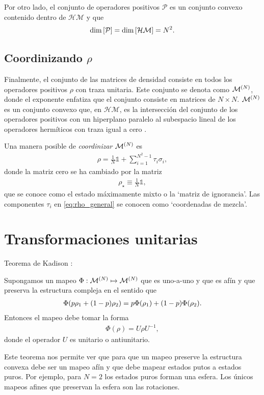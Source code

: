 Por otro lado, el conjunto de operadores positivos $\mathcal{P}$ es un 
conjunto convexo contenido dentro de $\mathcal{HM}$ y que
\begin{align}
	\dim \qty[\mathcal{P}] = \dim \qty[\mathcal{HM}]=N^2.
\end{align}
\subsection{Coordinizando  $\rho$} %

Finalmente, el conjunto de las matrices de densidad consiste en todos los operadores
positivos $\rho$ con traza unitaria. Este conjunto se denota como 
$\mathcal{M}^{(N)}$, donde el exponente enfatiza que el conjunto consiste en 
matrices de $N\times N$. $\mathcal{M}^{(N)}$ es un conjunto convexo que, en $\mathcal{HM}$, 
es la intersección del conjunto de los operadores positivos con un 
hiperplano paralelo al subespacio lineal de los operadores hermíticos
con traza igual a cero \cite{bengtsson_zyczkowski_2017}.

Una manera posible de \textit{coordinizar} $\mathcal{M}^{(N)}$ es 
\begin{align}
	\rho = \frac{1}{N} \mathbb{1} + \sum _{i=1}^{N^2-1} \tau_i\sigma_i,	
	\label{eq:rho_general}
\end{align}
donde la matriz cero se ha cambiado por la matriz
\begin{align}
	\rho _{\star} \equiv \frac{1}{N}\mathbb{1},
	\label{eq:max_mixed_state}
\end{align}
que se conoce como el estado máximamente mixto o la `matriz de ignorancia'. 
Las componentes $\tau_i$ en \eqref{eq:rho_general} se conocen como `coordenadas
de mezcla'.
\section{Transformaciones unitarias} %

Teorema de Kadison \cite{bengtsson_zyczkowski_2017}:
\begin{teorema} 
	Supongamos un mapeo $\Phi:\mathcal{M}^{(N)} \mapsto \mathcal{M}^{(N)}$ que es uno-a-uno y que es afín y
	que preserva la estructura compleja en el sentido que
	\begin{align}
		\Phi \qty(p\rho_1 + \qty(1-p)\rho_2) = p\Phi(\rho_1) + 
		\qty(1-p)\Phi(\rho_2).
	\end{align}
	Entonces el mapeo debe tomar la forma
	\begin{align}
		\Phi(\rho) = U\rho U^{-1},
	\end{align}
	donde el operador $U$ es unitario o antiunitario.
\end{teorema}

Este teorema nos permite ver que para que un mapeo preserve la estructura 
convexa debe ser un mapeo afín y que debe mapear estados putos
a estados puros. Por ejemplo, para $N=2$ los estados puros forman una
esfera. Los únicos mapeos afines que preservan la esfera son las rotaciones.





